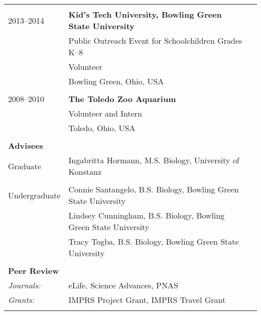 \documentclass[letterpaper,10pt,oneside]{article}
\begin{document}
\begin{longtable}{@{} l p{5.3in}l}
& \\
\large{2013–2014}
& \textbf{Kid's Tech University, Bowling Green State University} \\
& Public Outreach Event for Schoolchildren Grades K–8 \\
& Volunteer \\
& Bowling Green, Ohio, USA \\
& \\
\large{2008–2010}
& \textbf{The Toledo Zoo Aquarium} \\
& Volunteer and Intern \\
& Toledo, Ohio, USA \\
& \\

 \Large{\textbf{Advisees}}  \vspace{5mm} \\
 \large{Graduate} 
 & Ingabritta Hormann, M.S. Biology, University of Konstanz \\
 & \\
 \large{Undergraduate}
 &  Connie Santangelo, B.S. Biology, Bowling Green State University \\
 & Lindsey Cunningham, B.S. Biology, Bowling Green State University \\
 & Tracy Togba, B.S. Biology, Bowling Green State University \\
& \\

 \Large{\textbf{Peer Review}}  \vspace{5mm} \\
 \normalsize{\textit{Journals: }} & eLife, Science Advances, PNAS \vspace{1mm} \\
 \normalsize{\textit{Grants: }} & IMPRS Project Grant, IMPRS Travel Grant \vspace{1mm} \\
 & \\


\end{longtable}
\end{document}
